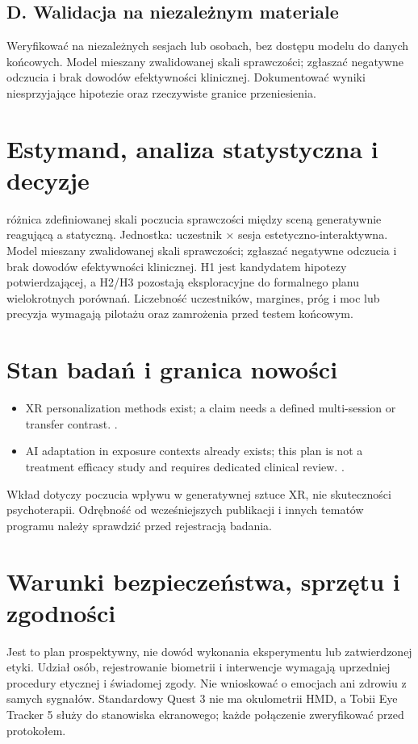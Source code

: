 \documentclass[11pt,a4paper]{article}
\begin{document}
\subsection{D. Walidacja na niezależnym materiale}
Weryfikować na niezależnych sesjach lub osobach, bez dostępu modelu do danych końcowych. Model mieszany zwalidowanej skali sprawczości; zgłaszać negatywne odczucia i brak dowodów efektywności klinicznej. Dokumentować wyniki niesprzyjające hipotezie oraz rzeczywiste granice przeniesienia.
\section{Estymand, analiza statystyczna i decyzje}
różnica zdefiniowanej skali poczucia sprawczości między sceną generatywnie reagującą a statyczną. Jednostka: uczestnik × sesja estetyczno-interaktywna. Model mieszany zwalidowanej skali sprawczości; zgłaszać negatywne odczucia i brak dowodów efektywności klinicznej. H1 jest kandydatem hipotezy potwierdzającej, a H2/H3 pozostają eksploracyjne do formalnego planu wielokrotnych porównań. Liczebność uczestników, margines, próg i moc lub precyzja wymagają pilotażu oraz zamrożenia przed testem końcowym.
\section{Stan badań i granica nowości}
\begin{itemize}
\item XR personalization methods exist; a claim needs a defined multi-session or transfer contrast. \cite{xrprior1}.
\item AI adaptation in exposure contexts already exists; this plan is not a treatment efficacy study and requires dedicated clinical review. \cite{xrprior2}.
\end{itemize}
Wkład dotyczy poczucia wpływu w generatywnej sztuce XR, nie skuteczności psychoterapii. Odrębność od wcześniejszych publikacji i innych tematów programu należy sprawdzić przed rejestracją badania.
\section{Warunki bezpieczeństwa, sprzętu i zgodności}
Jest to plan prospektywny, nie dowód wykonania eksperymentu lub zatwierdzonej etyki. Udział osób, rejestrowanie biometrii i interwencje wymagają uprzedniej procedury etycznej i świadomej zgody. Nie wnioskować o emocjach ani zdrowiu z samych sygnałów. Standardowy Quest 3 nie ma okulometrii HMD, a Tobii Eye Tracker 5 służy do stanowiska ekranowego; każde połączenie zweryfikować przed protokołem.
\end{document}
